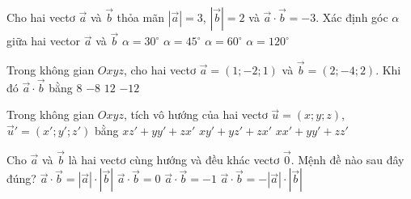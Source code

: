 \begin{ex}%
	Cho hai vectơ $\overrightarrow{a}$ và $\overrightarrow{b}$ thỏa mãn $\left|\overrightarrow{a}\right|=3$, $\left|\overrightarrow{b}\right|=2$ và $\overrightarrow{a}\cdot\overrightarrow{b} = -3$. Xác định  góc $\alpha$ giữa hai vector $\overrightarrow{a}$ và $\overrightarrow{b}$
	 \choice
		{$\alpha  = 30^\circ$}
		{$\alpha =  45^\circ$}
		 {$\alpha = 60^\circ$}
		{\True  $\alpha = 120^\circ$}
\end{ex}

\begin{ex}%
	Trong không gian $Oxyz$, cho hai vectơ $\overrightarrow{a}=(1;-2;1)$  và $\overrightarrow{b}=(2;-4;2)$. Khi đó $\overrightarrow{a} \cdot \overrightarrow{b}$ bằng
	\choice 
		 {$8$}
		{$-8$} 
		 {\True $12$}
		{$-12$} 
\end{ex}

\begin{ex}%
	Trong không gian $Oxyz$,  tích vô hướng của hai vectơ $\overrightarrow{u}=(x; y; {z})$, \break
	$\overrightarrow{u}'=\left(x'; y'; z'\right)$  bằng
		{$x  z'+y y'+z x'$}
		{$x y'+y z'+z x'$} 
		{\True $x x'+y  y'+z z'$}
\end{ex}

\begin{ex}%
	Cho $\overrightarrow{a}$ và $\overrightarrow{b}$ là hai vectơ cùng hướng và đều khác vectơ  $\overrightarrow{0}$. Mệnh đề nào sau đây đúng?
	\choice 
		{\True  $\overrightarrow{a}\cdot \overrightarrow{b}=\left|\overrightarrow{a}\right| \cdot\left|\overrightarrow{b}\right|$}
		 {$\overrightarrow{a}\cdot \overrightarrow{b}=0$}
		{$\overrightarrow{a}\cdot \overrightarrow{b}=-1$} 
		{$\overrightarrow{a}\cdot  \overrightarrow{b}=-\left|\overrightarrow{a}\right| \cdot\left|\overrightarrow{b}\right|$}
\end{ex}

